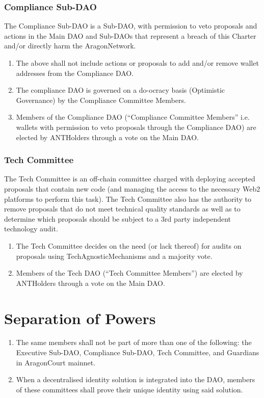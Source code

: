 \subsubsection*{Compliance Sub-\ac{DAO}}

The Compliance Sub-\ac{DAO} is a Sub-\ac{DAO}, with permission to veto proposals and actions in the Main \ac{DAO} and Sub-\acp{DAO} that represent a breach of this Charter and/or directly harm the \gls{AragonNetwork}.
\begin{enumerate}
	\item The above shall not include actions or proposals to add and/or remove wallet addresses from the Compliance \ac{DAO}.
	\item The compliance \ac{DAO} is governed on a do-ocracy basis (Optimistic Governance) by the Compliance Committee Members.
	\item Members of the Compliance \ac{DAO} (``Compliance Committee Members'' i.e. wallets with permission to veto proposals through the Compliance \ac{DAO}) are elected by \glspl{ANTHolder} through a vote on the Main \ac{DAO}.
\end{enumerate}


\subsubsection*{Tech Committee}

The Tech Committee is an off-chain committee charged with deploying accepted proposals that contain new code (and managing the access to the necessary Web2 platforms to perform this task).
The Tech Committee also has the authority to remove proposals that do not meet technical quality standards as well as to determine which proposals should be subject to a 3rd party independent technology audit.
\begin{enumerate}
	\item The Tech Committee decides on the need (or lack thereof) for audits on proposals using \gls{TechAgnosticMechanisms} and a majority vote.
	\item Members of the Tech \ac{DAO} (``Tech Committee Members'') are elected by \glspl{ANTHolder} through a vote on the Main \ac{DAO}.
\end{enumerate}

\section{Separation of Powers}

\begin{enumerate}
	\item The same members shall not be part of more than one of the following: the Executive Sub-\ac{DAO}, Compliance Sub-\ac{DAO}, Tech Committee, and \glspl{Guardian} in \gls{AragonCourt} mainnet.
	\item When a decentralised identity solution is integrated into the \ac{DAO}, members of these committees shall prove their unique identity using said solution.
\end{enumerate}


